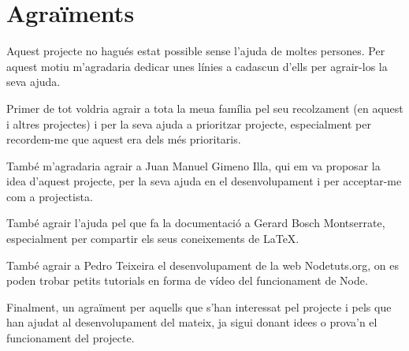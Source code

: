 \chapter*{Agraïments}

Aquest projecte no hagués estat possible sense l'ajuda de moltes persones. Per aquest motiu m'agradaria dedicar unes línies a cadascun d'ells per agrair-los la seva ajuda.

Primer de tot voldria agrair a tota la meua família pel seu recolzament (en aquest i altres projectes) i per la seva ajuda a prioritzar projecte, especialment per recordem-me que aquest era dels més prioritaris. 

També m'agradaria agrair a Juan Manuel Gimeno Illa, qui em va proposar la idea d'aquest projecte, per la seva ajuda en el desenvolupament i per acceptar-me com a projectista. 

També agrair l'ajuda pel que fa la documentació a Gerard Bosch Montserrate, especialment per compartir els seus coneixements de LaTeX.

També agrair a Pedro Teixeira el desenvolupament de la web Nodetuts.org, on es poden trobar petits tutorials en forma de vídeo del funcionament de Node.

Finalment, un agraïment per aquells que s'han interessat pel projecte i pels que han ajudat al desenvolupament del mateix, ja sigui donant idees o prova'n el funcionament del projecte. 

